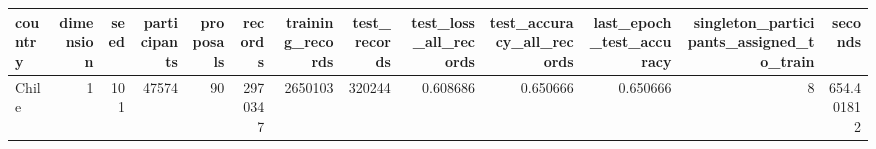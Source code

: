 \begin{tabular}{lrrrrrrrrrrrr}
\toprule
country & dimension & seed & participants & proposals & records & training_records & test_records & test_loss_all_records & test_accuracy_all_records & last_epoch_test_accuracy & singleton_participants_assigned_to_train & seconds \\
\midrule
Chile & 1 & 101 & 47574 & 90 & 2970347 & 2650103 & 320244 & 0.608686 & 0.650666 & 0.650666 & 8 & 654.401812 \\
\bottomrule
\end{tabular}

